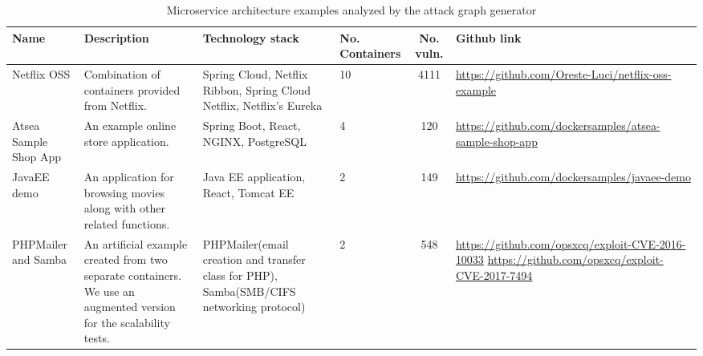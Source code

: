 \begin{table*}[t]
	\begin{center}
		\begin{tabular}{ p{20mm}p{35mm}p{35mm}p{10mm}cp{35mm} } 
			\hline
			Name & Description & Technology stack & No. Containers & No. vuln. & Github link \\\hline 
			
			Netflix OSS & Combination of containers provided from Netflix. & Spring Cloud, Netflix Ribbon, Spring Cloud Netflix, Netflix's Eureka & 10 & 4111 & \url{https://github.com/Oreste-Luci/netflix-oss-example} \\
			
			Atsea Sample Shop App & An example online store application. & Spring Boot, React, NGINX, PostgreSQL & 4 & 120 & \url{https://github.com/dockersamples/atsea-sample-shop-app} \\
			
			JavaEE demo & An application for browsing movies along with other related functions. & Java EE application, React, Tomcat EE & 2 & 149 & \url{https://github.com/dockersamples/javaee-demo} \\
			
			PHPMailer and Samba & An artificial example created from two separate containers. We use an augmented version for the scalability tests. & PHPMailer(email creation and transfer class for PHP), Samba(SMB/CIFS networking protocol) & 2 & 548 &  \url{https://github.com/opsxcq/exploit-CVE-2016-10033}
			\url{https://github.com/opsxcq/exploit-CVE-2017-7494} \\
			
			
			\hline
		\end{tabular}
	\end{center}
	
	\caption{Microservice architecture examples analyzed by the attack graph generator}
	\label{table_technologies}
	
\end{table*}
